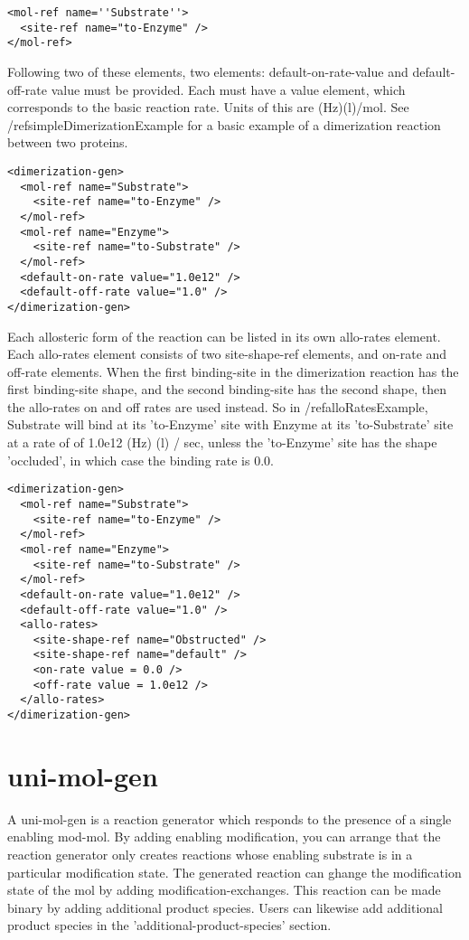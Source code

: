 \begin{lstlisting}
<mol-ref name=''Substrate''>
  <site-ref name="to-Enzyme" />
</mol-ref>
\end{lstlisting}

Following two of these elements, two elements: default-on-rate-value
and default-off-rate value must be provided.  Each must have a value
element, which corresponds to the basic reaction rate.  Units of this
are (Hz)(l)/mol.  See /ref{simpleDimerizationExample} for a basic
example of a dimerization reaction between two proteins.

\begin{lstlisting}
<dimerization-gen>
  <mol-ref name="Substrate">
    <site-ref name="to-Enzyme" />
  </mol-ref>
  <mol-ref name="Enzyme">
    <site-ref name="to-Substrate" />
  </mol-ref>
  <default-on-rate value="1.0e12" />
  <default-off-rate value="1.0" />
</dimerization-gen>
\end{lstlisting}

Each allosteric form of the reaction can be listed in its own
allo-rates element.  Each allo-rates element consists of two
site-shape-ref elements, and on-rate and off-rate elements.  When the
first binding-site in the dimerization reaction has the first
binding-site shape, and the second binding-site has the second shape,
then the allo-rates on and off rates are used instead.  So in
/ref{alloRatesExample}, Substrate will bind at its 'to-Enzyme' site
with Enzyme at its 'to-Substrate' site at a rate of of 1.0e12 (Hz) (l)
/ sec, unless the 'to-Enzyme' site has the shape 'occluded', in which
case the binding rate is 0.0.

\begin{lstlisting} 
<dimerization-gen>
  <mol-ref name="Substrate">
    <site-ref name="to-Enzyme" />
  </mol-ref>
  <mol-ref name="Enzyme">
    <site-ref name="to-Substrate" />
  </mol-ref>
  <default-on-rate value="1.0e12" />
  <default-off-rate value="1.0" />
  <allo-rates>
    <site-shape-ref name="Obstructed" />
    <site-shape-ref name="default" />
    <on-rate value = 0.0 />
    <off-rate value = 1.0e12 />
  </allo-rates>
</dimerization-gen>
 \end{lstlisting}


\section{uni-mol-gen}
A uni-mol-gen is a reaction generator which responds to the presence
of a single enabling mod-mol.  By adding enabling modification, you
can arrange that the reaction generator only creates reactions whose
enabling substrate is in a particular modification state.  The
generated reaction can ghange the modification state of the mol by
adding modification-exchanges.  This reaction can be made
binary by adding additional product species.  Users can likewise add
additional product species in the 'additional-product-species'
section.  

